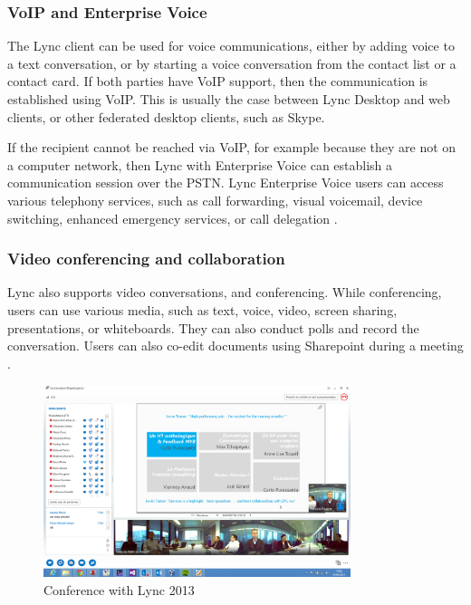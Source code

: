 
\subsubsection{VoIP and Enterprise Voice}
The Lync client can be used for voice communications, either by adding voice to a text conversation, or by starting a voice conversation from the contact list or a contact card. If both parties have VoIP support, then the communication is established using VoIP. This is usually the case between Lync Desktop and web clients, or other federated desktop clients, such as Skype.

If the recipient cannot be reached via VoIP, for example because they are not on a computer network, then Lync with Enterprise Voice can establish a communication session over the PSTN.
Lync Enterprise Voice users can access various telephony services, such as call forwarding, visual voicemail, device switching, enhanced emergency services, or call delegation
\cite[Ch. 1.1]{winters_mastering_2012}.

\subsubsection{Video conferencing and collaboration}
Lync also supports video conversations, and conferencing. While conferencing, users can use various media, such as text, voice, video, screen sharing, presentations, or whiteboards. They can also conduct polls and record the conversation. Users can also co-edit documents using Sharepoint during a meeting
\cite[Ch. 1.1]{winters_mastering_2012}.

\begin{figure}[h!]
	\centering
	\includegraphics[width=0.8\textwidth]{Schemas/lync.png}
	\caption{Conference with Lync 2013}
	\label{fig:lync_conferencing}
\end{figure}

